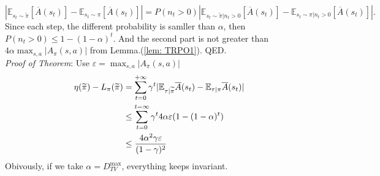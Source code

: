 \documentclass[11pt,a4paper]{article}
\def\tilde{\widetilde}
\def\epsilon{\varepsilon}
\def\tilde{\widetilde}
\def\bar{\overline}
\def\E{\mathbb{E}}
\begin{document}
\begin{equation}
    |\E_{s_t\sim\tilde{\pi}}[\bar{A}(s_t)]-\E_{s_t\sim\pi}[\bar{A}(s_t)]| = P(n_t>0)|\E_{s_t\sim\tilde{\pi}|n_t>0}[\bar{A}(s_t)]-\E_{s_t\sim\pi|n_t>0}[\bar{A}(s_t)]|.
\end{equation}
Since each step, the different probability is samller than $\alpha$, then $P(n_t>0) \le 1 - (1-\alpha)^t$. And the second part is not greater than $4\alpha \max_{s,a}|A_{\pi}(s,a)|$ from Lemma.(\ref{lem: TRPO1}).
QED.\\ 
\emph{Proof of Theorem}:
Use $\epsilon = \max_{s,a}|A_{\pi}(s,a)|$
\begin{equation}
\aligned 
\eta(\tilde{\pi}) - L_{\pi}(\tilde{\pi}) & = \sum_{t=0}^{+\infty} \gamma^t |\E_{\tau|\tilde{\pi}}\bar{A}(s_t) - \E_{\tau|\pi}\bar{A}(s_t)| \\ 
& \le \sum_{t=0}^{t=\infty} \gamma^t 4\alpha \epsilon (1-(1-\alpha)^t) \\ 
& \le \frac{4\alpha^2\gamma \epsilon}{(1-\gamma)^2}
\endaligned
\end{equation}
Obivously, if we take $\alpha = D_{TV}^{\max}$, everything keeps invariant.
\end{document}
